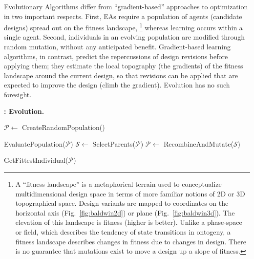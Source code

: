 Evolutionary Algorithms \cite{fogel1998evolutionary,cliff1993explorations,floreano1996homing,harvey1997evolutionary,nolfi2000evolutionary} differ from ``gradient-based'' approaches to optimization in two important respects.
First, EAs require a population of agents (candidate designs) spread out on the fitness landscape,%
\footnote{%
A ``fitness landscape'' is a metaphorical terrain
used to conceptualize multidimensional design space in terms of more familiar notions of 2D or 3D topographical space.
Design variants are mapped to coordinates on the horizontal axis (Fig.~\ref{fig:baldwin2d}) or plane (Fig.~\ref{fig:baldwin3d}).
The elevation of this landscape is fitness (higher is better).
Unlike a phase-space or field, which describes the tendency of state transitions in ontogeny, a fitness landscape describes changes in fitness due to changes in design.
There is no guarantee that mutations exist to move a design up a slope of fitness.
} 
whereas learning occurs within a single agent.
Second, individuals in an evolving population are modified through random mutation, without any anticipated benefit.
Gradient-based learning algorithms, in contrast, predict the repercussions of design revisions before applying them;
they estimate the local topography (the gradients) of the fitness landscape around the current design,
so that revisions can be applied that are expected to improve the design (climb the gradient).
Evolution has no such foresight.


\begin{algorithm}
\caption{\hspace{-4pt}\textbf{: Evolution.}}\label{alg:evo}
\begin{algorithmic}[1]
\State $\mathcal{P} \gets$ CreateRandomPopulation() 

\State EvaluatePopulation($\mathcal{P}$) 
\State $\mathcal{S} \gets $ SelectParents($\mathcal{P}$)
\State $\mathcal{P} \gets $ RecombineAndMutate($\mathcal{S}$)  

\EndWhile
\State \Return GetFittestIndividual($\mathcal{P}$) 
\end{algorithmic}
\end{algorithm}




